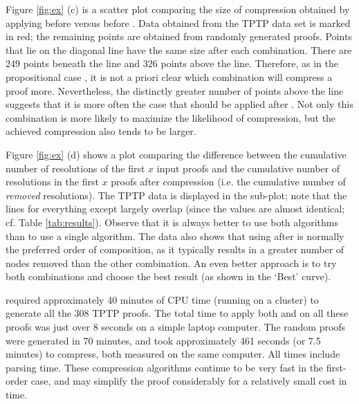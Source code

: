 {Figure \ref{fig:ex} (c) is a scatter plot comparing the size of compression obtained by applying {\FORPI} before {\GFOLU} versus {\GFOLU} before {\FORPI}. Data obtained from the TPTP data set is marked in red; the remaining points are obtained from randomly generated proofs. Points that lie on the diagonal line have the same size after each combination. There are 249 points beneath the line and 326 points above the line. Therefore, as in the propositional case \cite{LURPI}, it is not a priori clear which combination will compress a proof more. Nevertheless, the distinctly greater number of points above the line suggests that it is more often the case that {\FORPI} should be applied after {\GFOLU}. Not only this combination is more likely to maximize the likelihood of compression, but the achieved compression also tends to be larger.

Figure \ref{fig:ex} (d) shows a plot comparing the difference between the cumulative number of resolutions of the first $x$ input proofs and the cumulative number of resolutions in the first $x$ proofs after compression (i.e. the cumulative number of \emph{removed} resolutions). The TPTP data is displayed in the sub-plot; note that the lines for everything except {\FORPI} largely overlap (since the values are almost identical; cf. Table \ref{tab:results}). Observe that it is always better to use both algorithms than to use a single algorithm. The data also shows that using {\FORPI} after {\GFOLU} is normally the preferred order of composition, as it typically results in a greater number of nodes removed than the other combination. An even better approach is to try both combinations and choose the best result (as shown in the `Best' curve).  


{\SPASS} required approximately 40 minutes of CPU time (running on a cluster) to generate all the 308 TPTP proofs. The total time to apply both {\FORPI} and {\GFOLU} on all these proofs was just over 8 seconds on a simple laptop computer. The random proofs were generated in 70 minutes, and took approximately 461 seconds (or 7.5 minutes) to compress, both measured on the same computer.
All times include parsing time. These compression algorithms continue to be very fast in the first-order case, and may simplify the proof considerably for a relatively small cost in time.

}
